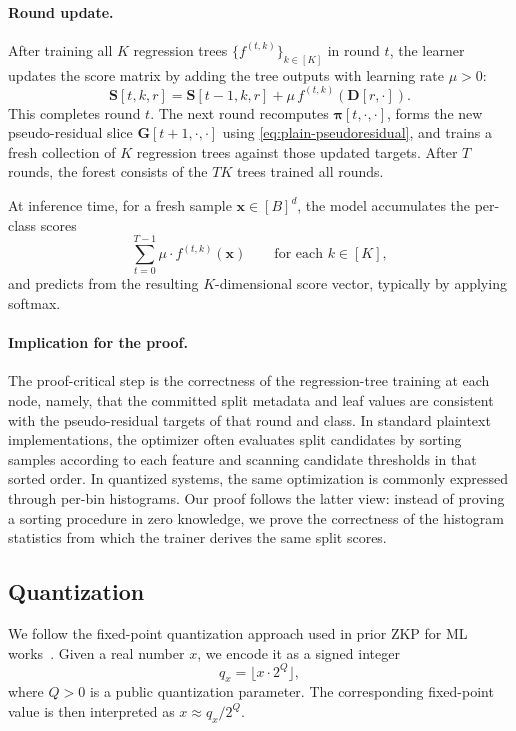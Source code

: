 \paragraph{Round update.}
After training all $K$ regression trees
$\{f^{(t,k)}\}_{k\in[K]}$ in round $t$, the learner updates the score matrix by
adding the tree outputs with learning rate $\mu>0$:
\begin{equation}\label{eq:plain-score-update}
\mathbf{S}[t,k,r]
=
\mathbf{S}[t-1,k,r] + \mu\, f^{(t,k)}(\mathbf{D}[r,\cdot]).
\end{equation}
This completes round $t$. The next round recomputes
$\boldsymbol{\pi}[t,\cdot,\cdot]$, forms the new pseudo-residual slice
$\mathbf{G}[t+1,\cdot,\cdot]$ using \eqref{eq:plain-pseudoresidual}, and trains a fresh
collection of $K$ regression trees against those updated targets. After $T$
rounds, the forest consists of the $TK$ trees trained all rounds.

At inference time, for a fresh sample $\mathbf{x}\in[B]^d$, the model
accumulates the per-class scores
\[
\sum_{t=0}^{T-1} \mu\cdot f^{(t,k)}(\mathbf{x})
\qquad\text{for each }k\in[K],
\]
and predicts from the resulting $K$-dimensional score vector, typically by
applying softmax.

\paragraph{Implication for the proof.}
The proof-critical step is the correctness of the regression-tree training at
each node, namely, that the committed split metadata and leaf values are
consistent with the pseudo-residual targets of that round and class. In
standard plaintext implementations, the optimizer often evaluates split
candidates by sorting samples according to each feature and scanning candidate
thresholds in that sorted order. In quantized systems, the same optimization is
commonly expressed through per-bin histograms. Our proof follows the latter
view: instead of proving a sorting procedure in zero knowledge, we prove the
correctness of the histogram statistics from which the trainer derives the same
split scores.

\subsection{Quantization}\label{subsec:prelim-quantization}

We follow the fixed-point quantization approach used in prior ZKP for ML works~\cite{sparrow24,zkdt20,zkboost26}. 
Given a real number $x$, we encode it as a signed integer
\[
q_x = \lfloor x \cdot 2^Q \rfloor,
\]
where $Q>0$ is a public quantization parameter. The corresponding fixed-point value is then interpreted as $x \approx q_x / 2^Q$.

